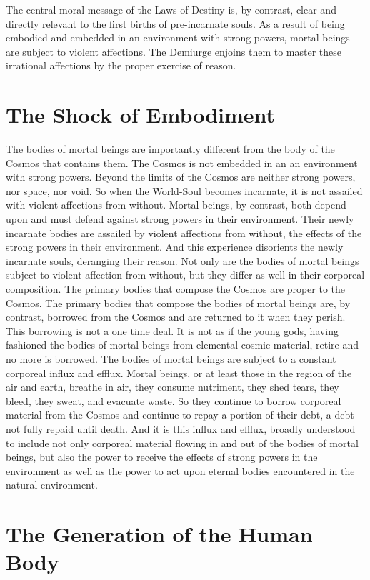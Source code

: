 The central moral message of the Laws of Destiny is, by contrast, clear and directly relevant to the first births of pre-incarnate souls. As a result of being embodied and embedded in an environment with strong powers, mortal beings are subject to violent affections. The Demiurge enjoins them to master these irrational affections by the proper exercise of reason.



\section{The Shock of Embodiment} %
\label{sec:the_shock_of_embodiment}

The bodies of mortal beings are importantly different from the body of the Cosmos that contains them. The Cosmos is not embedded in an an environment with strong powers. Beyond the limits of the Cosmos are neither strong powers, nor space, nor void. So when the World-Soul becomes incarnate, it is not assailed with violent affections from without. Mortal beings, by contrast, both depend upon and must defend against strong powers in their environment. Their newly incarnate bodies are assailed by violent affections from without, the effects of the strong powers in their environment. And this experience disorients the newly incarnate souls, deranging their reason. Not only are the bodies of mortal beings subject to violent affection from without, but they differ as well in their corporeal composition. The primary bodies that compose the Cosmos are proper to the Cosmos. The primary bodies that compose the bodies of mortal beings are, by contrast, borrowed from the Cosmos and are returned to it when they perish. This borrowing is not a one time deal. It is not as if the young gods, having fashioned the bodies of mortal beings from elemental cosmic material, retire and no more is borrowed. The bodies of mortal beings are subject to a constant corporeal influx and efflux. Mortal beings, or at least those in the region of the air and earth, breathe in air, they consume nutriment, they shed tears, they bleed, they sweat, and evacuate waste. So they continue to borrow corporeal material from the Cosmos and continue to repay a portion of their debt, a debt not fully repaid until death. And it is this influx and efflux, broadly understood to include not only corporeal material flowing in and out of the bodies of mortal beings, but also the power to receive the effects of strong powers in the environment as well as the power to act upon eternal bodies encountered in the natural environment.




\section{The Generation of the Human Body} %
\label{sec:structuring_the_human_body}





